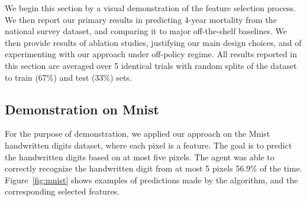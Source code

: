 \documentclass[reqno,11pt]{article}
\begin{document}
We begin this section by a visual demonstration of the feature selection process. We then report our primary results in predicting 4-year mortality from the national survey dataset, and comparing it to major off-the-shelf baselines.
We then provide  results of ablation studies, justifying our main design choices, and of experimenting with our approach under off-policy regime.
All results reported in this section are averaged over 5 identical trials with random splits of the dataset to train (67\%) and test (33\%) sets.

\subsection{Demonstration on Mnist}
For the purpose of demonstration, we applied our approach on the Mnist handwritten digits dataset, where each pixel is a feature.  The goal is to predict the handwritten digits based on at most five pixels. The agent was able to correctly recognize the handwritten digit from at most 5 pixels 56.9\% of the time.
Figure~\ref{fig:mnist} shows examples of predictions made by the algorithm, and the corresponding selected features.
\end{document}
